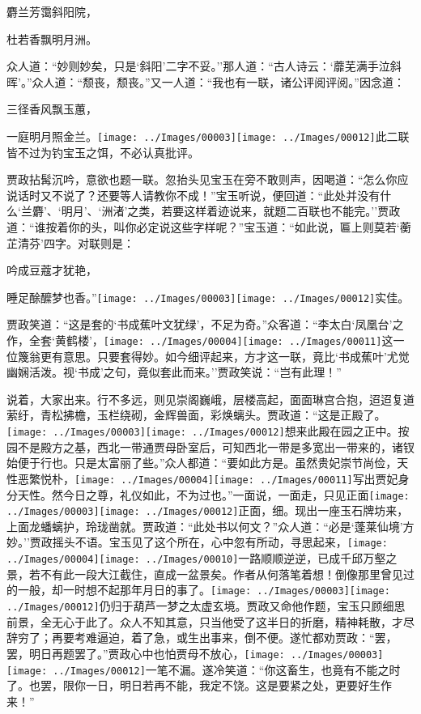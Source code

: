麝兰芳霭斜阳院，

杜若香飘明月洲。

众人道：``妙则妙矣，只是`斜阳'二字不妥。''那人道：``古人诗云：`蘼芜满手泣斜晖'。''众人道：``颓丧，颓丧。''又一人道：``我也有一联，诸公评阅评阅。''因念道：

三径香风飘玉蕙，

一庭明月照金兰。{\texttt{[image: ../Images/00003]}\texttt{[image: ../Images/00012]}\footnotesize \kaishu 此二联皆不过为钓宝玉之饵，不必认真批评。}

贾政拈髯沉吟，意欲也题一联。忽抬头见宝玉在旁不敢则声，因喝道：``怎么你应说话时又不说了？还要等人请教你不成！''宝玉听说，便回道：``此处并没有什么`兰麝'、`明月'、`洲渚'之类，若要这样着迹说来，就题二百联也不能完。''贾政道：``谁按着你的头，叫你必定说这些字样呢？''宝玉道：``如此说，匾上则莫若`蘅芷清芬'四字。对联则是：

吟成豆蔻才犹艳，

睡足酴醿梦也香。''{\texttt{[image: ../Images/00003]}\texttt{[image: ../Images/00012]}\footnotesize \kaishu 实佳。}

贾政笑道：``这是套的`书成蕉叶文犹绿'，不足为奇。''众客道：``李太白`凤凰台'之作，全套`黄鹤楼'，{\texttt{[image: ../Images/00004]}\texttt{[image: ../Images/00011]}\footnotesize \kaishu 这一位篾翁更有意思。}只要套得妙。如今细评起来，方才这一联，竟比`书成蕉叶'尤觉幽娴活泼。视`书成'之句，竟似套此而来。''贾政笑说：``岂有此理！''

说着，大家出来。行不多远，则见崇阁巍峨，层楼高起，面面琳宫合抱，迢迢复道萦纡，青松拂檐，玉栏绕砌，金辉兽面，彩焕螭头。贾政道：``这是正殿了。{\texttt{[image: ../Images/00003]}\texttt{[image: ../Images/00012]}\footnotesize \kaishu 想来此殿在园之正中。按园不是殿方之基，西北一带通贾母卧室后，可知西北一带是多宽出一带来的，诸钗始便于行也。}只是太富丽了些。''众人都道：``要如此方是。虽然贵妃崇节尚俭，天性恶繁悦朴，{\texttt{[image: ../Images/00004]}\texttt{[image: ../Images/00011]}\footnotesize \kaishu 写出贾妃身分天性。}然今日之尊，礼仪如此，不为过也。''一面说，一面走，只见正面{\texttt{[image: ../Images/00003]}\texttt{[image: ../Images/00012]}\footnotesize \kaishu 正面，细。}现出一座玉石牌坊来，上面龙蟠螭护，玲珑凿就。贾政道：``此处书以何文？''众人道：``必是`蓬莱仙境'方妙。''贾政摇头不语。宝玉见了这个所在，心中忽有所动，寻思起来，{\texttt{[image: ../Images/00004]}\texttt{[image: ../Images/00010]}\footnotesize \kaishu 一路顺顺逆逆，已成千邱万壑之景，若不有此一段大江截住，直成一盆景矣。作者从何落笔着想！}倒像那里曾见过的一般，却一时想不起那年月日的事了。{\texttt{[image: ../Images/00003]}\texttt{[image: ../Images/00012]}\footnotesize \kaishu 仍归于葫芦一梦之太虚玄境。}贾政又命他作题，宝玉只顾细思前景，全无心于此了。众人不知其意，只当他受了这半日的折磨，精神耗散，才尽辞穷了；再要考难逼迫，着了急，或生出事来，倒不便。遂忙都劝贾政：``罢，罢，明日再题罢了。''贾政心中也怕贾母不放心，{\texttt{[image: ../Images/00003]}\texttt{[image: ../Images/00012]}\footnotesize \kaishu 一笔不漏。}遂冷笑道：``你这畜生，也竟有不能之时了。也罢，限你一日，明日若再不能，我定不饶。这是要紧之处，更要好生作来！''

